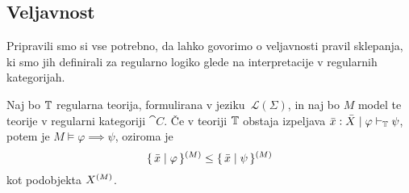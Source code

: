 \documentclass[../kategoricna_logika.tex]{subfiles}
\begin{document}
\subsection{Veljavnost}
Pripravili smo si vse potrebno, da lahko govorimo o veljavnosti pravil
sklepanja, ki smo jih definirali za regularno logiko glede na
interpretacije v regularnih kategorijah.
\begin{izrek}[Veljavnost]
  Naj bo $\mathbb{T}$ regularna teorija, formulirana v
  jeziku~$\mathcal{L}(\Sigma)$, in naj bo $M$ model te teorije v
  regularni kategoriji $\cat{C}$.  Če v teoriji $\mathbb{T}$ obstaja izpeljava
  $\bar{x}:\bar{X} \mid \varphi \vdash_{\mathbb{T}} \psi$, potem je
  $M \models \varphi \implies \psi$, oziroma je
  \[\lbrace\,\bar{x}  \mid  \varphi\,\rbrace^{(M)} \leq \lbrace\,\bar{x}
       \mid  \psi\,\rbrace^{(M)}\] kot podobjekta ${X}^{(M)}$.
\end{izrek}
\end{document}
